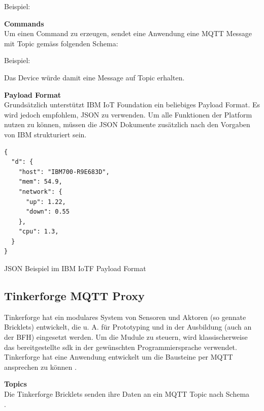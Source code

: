 Beispiel: 

\textbf{Commands} \\
Um einen Command zu erzeugen, sendet eine Anwendung eine MQTT Message mit Topic gemäss folgenden Schema:

Beispiel: 

Das Device  würde damit eine Message auf Topic  erhalten.


\textbf{Payload Format} \\
Grundsätzlich unterstützt IBM IoT Foundation ein beliebiges Payload Format. Es wird jedoch empfohlem, JSON zu verwenden. Um alle Funktionen der Platform nutzen zu können, müssen die JSON Dokumente zusätzlich nach den Vorgaben \cite{ibmIotF:payload} von IBM strukturiert sein.

\begin{listing}[H]
\begin{verbatim}
{
  "d": {
    "host": "IBM700-R9E683D",
    "mem": 54.9,
    "network": {
      "up": 1.22,
      "down": 0.55
    },
    "cpu": 1.3,
  }
}
\end{verbatim}
\caption{JSON Beispiel im IBM IoTF Payload Format}
\end{listing}



\subsection{Tinkerforge MQTT Proxy}

Tinkerforge hat ein modulares System von Sensoren und Aktoren (so gennate Bricklets) entwickelt, die u. A. für Prototyping und in der Ausbildung (auch an der BFH) eingesetzt werden. Um die Mudule zu steuern, wird klassischerweise das bereitgestellte \acrfull{sdk} in der gewünschten Programmiersprache verwendet. 
Tinkerforge hat eine Anwendung entwickelt um die Bausteine per MQTT ansprechen zu können \cite{tinkerf:mqtt}.

\textbf{Topics} \\
Die Tinkerforge Bricklets senden ihre Daten an ein MQTT Topic nach Schema \\ .

